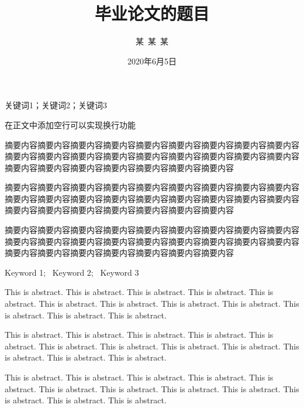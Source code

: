 \documentclass{shnuthesis}
\title{毕业论文的题目} %
\author{某~某~某} %
\date{2020年6月5日} %
\begin{document}
\maketitle


\clearpage   %

\begin{cnabstract}{关键词1；关键词2；关键词3}

在正文中添加空行可以实现换行功能
		
摘要内容摘要内容摘要内容摘要内容摘要内容摘要内容摘要内容摘要内容摘要内容摘要内容摘要内容摘要内容摘要内容摘要内容摘要内容摘要内容摘要内容摘要内容摘要内容摘要内容摘要内容摘要内容摘要内容摘要内容摘要内容
		
摘要内容摘要内容摘要内容摘要内容摘要内容摘要内容摘要内容摘要内容摘要内容摘要内容摘要内容摘要内容摘要内容摘要内容摘要内容摘要内容摘要内容摘要内容摘要内容摘要内容摘要内容摘要内容摘要内容摘要内容摘要内容

摘要内容摘要内容摘要内容摘要内容摘要内容摘要内容摘要内容摘要内容摘要内容摘要内容摘要内容摘要内容摘要内容摘要内容摘要内容摘要内容摘要内容摘要内容摘要内容摘要内容摘要内容摘要内容摘要内容摘要内容摘要内容

\end{cnabstract}



\begin{enabstract}{Keyword 1;~ Keyword 2;~ Keyword 3}


This is abstract. This is abstract. This is abstract. This is abstract. This is abstract. This is abstract. This is abstract. This is abstract. This is abstract. This is abstract. This is abstract. This is abstract.
		
This is abstract. This is abstract. This is abstract. This is abstract. This is abstract. This is abstract. This is abstract. This is abstract. This is abstract. This is abstract. This is abstract. This is abstract.

This is abstract. This is abstract. This is abstract. This is abstract. This is abstract. This is abstract. This is abstract. This is abstract. This is abstract. This is abstract. This is abstract. This is abstract.

\end{enabstract}
	
\end{document}
